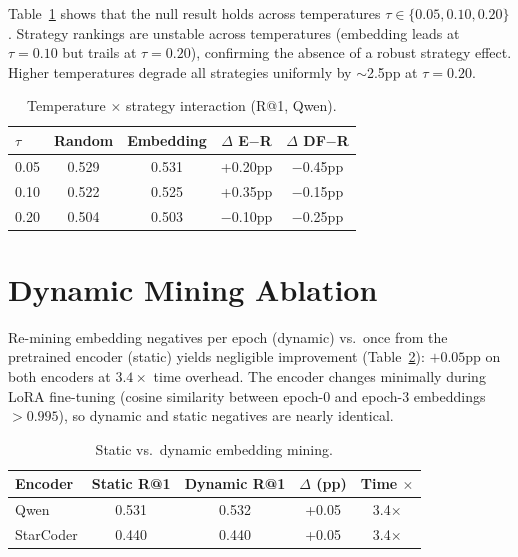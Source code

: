 \documentclass[11pt,a4paper]{article}
\begin{document}
Table~\ref{tab:temp} shows that the null result holds across temperatures $\tau \in \{0.05, 0.10, 0.20\}$.
Strategy rankings are unstable across temperatures (embedding leads at $\tau=0.10$ but trails at $\tau=0.20$), confirming the absence of a robust strategy effect.
Higher temperatures degrade all strategies uniformly by $\sim$2.5pp at $\tau=0.20$.

\begin{table}[h]
\centering
\caption{Temperature $\times$ strategy interaction (R@1, Qwen).}
\label{tab:temp}
\small
\begin{tabular}{lcccc}
\toprule
$\tau$ & \textbf{Random} & \textbf{Embedding} & $\Delta$ \textbf{E$-$R} & $\Delta$ \textbf{DF$-$R} \\
\midrule
0.05 & 0.529 & 0.531 & +0.20pp & $-$0.45pp \\
0.10 & 0.522 & 0.525 & +0.35pp & $-$0.15pp \\
0.20 & 0.504 & 0.503 & $-$0.10pp & $-$0.25pp \\
\bottomrule
\end{tabular}
\end{table}

\section{Dynamic Mining Ablation}
\label{app:dynamic}

Re-mining embedding negatives per epoch (dynamic) vs.\ once from the pretrained encoder (static) yields negligible improvement (Table~\ref{tab:dynamic}): $+0.05$pp on both encoders at $3.4\times$ time overhead.
The encoder changes minimally during LoRA fine-tuning (cosine similarity between epoch-0 and epoch-3 embeddings $>0.995$), so dynamic and static negatives are nearly identical.

\begin{table}[h]
\centering
\caption{Static vs.\ dynamic embedding mining.}
\label{tab:dynamic}
\small
\begin{tabular}{lcccc}
\toprule
\textbf{Encoder} & \textbf{Static R@1} & \textbf{Dynamic R@1} & $\Delta$ \textbf{(pp)} & \textbf{Time $\times$} \\
\midrule
Qwen & 0.531 & 0.532 & +0.05 & 3.4$\times$ \\
StarCoder & 0.440 & 0.440 & +0.05 & 3.4$\times$ \\
\bottomrule
\end{tabular}
\end{table}
\end{document}
